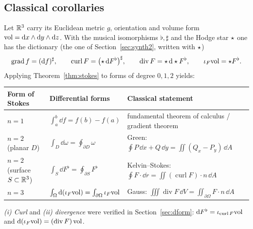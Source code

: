 \subsection{Classical corollaries}\label{sec:classical}

Let $\mathbb{R}^3$ carry its Euclidean metric $g$, orientation and volume form $\mathrm{vol}=\mathrm{d} x\wedge\mathrm{d} y\wedge\mathrm{d} z$. With the musical isomorphisms $\flat,\sharp$ and the Hodge star $\star$ one has the dictionary (the one of Section~\ref{sec:synth2}, written with $\star$)
\[
\operatorname{grad}f=(\mathrm{d} f)^\sharp,\qquad
\operatorname{curl}F=\bigl(\star\,\mathrm{d} F^\flat\bigr)^\sharp,\qquad
\operatorname{div}F=\star\,\mathrm{d}\star F^\flat,\qquad
\iota_F\mathrm{vol}=\star F^\flat .
\]
Applying Theorem~\ref{thm:stokes} to forms of degree $0,1,2$ yields:

\begin{center}
\small
\renewcommand{\arraystretch}{1.4}
\begin{tabular}{@{}p{2.5cm}p{4.5cm}p{7.0cm}@{}}
\toprule
\textbf{Form of Stokes} & \textbf{Differential forms} & \textbf{Classical statement}\\
\midrule
$n=1$ & $\int_a^b\dd f=f(b)-f(a)$ & fundamental theorem of calculus / gradient theorem\\
$n=2$ (planar $D$) & $\int_D\dd\omega=\oint_{\partial D}\omega$ & Green: $\oint P\,\dd x+Q\,\dd y=\iint(Q_x-P_y)\,\dd A$\\
$n=2$ (surface $S\subset\mathbb{R}^3$) & $\int_S\dd F^\flat=\oint_{\partial S}F^\flat$ & Kelvin--Stokes: $\oint F\cdot\dd r=\iint(\operatorname{curl}F)\cdot n\,\dd A$\\
$n=3$ & $\int_\Omega\mathrm{d}(\iota_F\mathrm{vol})=\int_{\partial\Omega}\iota_F\mathrm{vol}$ & Gauss: $\iiint\operatorname{div}F\,\dd V=\iint_{\partial\Omega}F\cdot n\,\dd A$\\
\bottomrule
\end{tabular}
\end{center}

\emph{(i) Curl} and \emph{(ii) divergence} were verified in Section~\ref{sec:dform}: $\mathrm{d} F^\flat=\iota_{\operatorname{curl}F}\mathrm{vol}$ and
$\mathrm{d}(\iota_F\mathrm{vol})=(\operatorname{div}F)\,\mathrm{vol}$.

